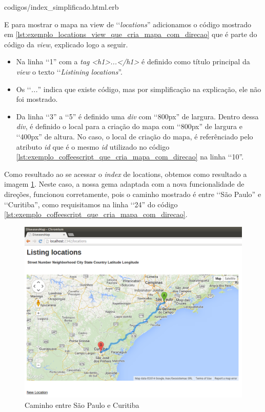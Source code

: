 
{codigos/index_simplificado.html.erb}

E para mostrar o mapa na view de ‘‘\emph{locations}'' adicionamos o código mostrado em
\ref{lst:exemplo_locations_view_que_cria_mapa_com_direcao}
que é parte do código da \emph{view}, explicado logo a seguir.

\begin{itemize}

 \item Na linha ‘‘1'' com a \emph{tag} \emph{<h1>...</h1>} é definido como título principal da \emph{view} o
 texto ‘‘\emph{Listining locations}''.

 \item Os ‘‘\emph{...}'' indica que existe código, mas por simplificação na explicação, ele não foi mostrado.

 \item Da linha ‘‘3'' a ‘‘5'' é definido uma \emph{div} com ‘‘800px'' de largura. Dentro dessa \emph{div},
 é definido o local para a criação do mapa com ‘‘800px'' de largura e ‘‘400px'' de altura. No caso, o local
 de criação do mapa, é referênciado pelo atributo \emph{id} que é o mesmo \emph{id} utilizado no código
 \ref{lst:exemplo_coffeescript_que_cria_mapa_com_direcao} na linha ‘‘10''.

\end{itemize}

Como resultado ao se acessar o \emph{index} de locations, obtemos como resultado a imagem
\ref{fig:caminho_entre_sao_paulo_e_curitiba}. Neste caso, a nossa gema adaptada com a nova funcionalidade
de direções, funcionou corretamente, pois o caminho mostrado é entre ‘‘São Paulo'' e ‘‘Curitiba'', como
requisitamos na linha ‘‘24'' do código \ref{lst:exemplo_coffeescript_que_cria_mapa_com_direcao}.

\begin{figure}[ht]
  \begin{center}
    \includegraphics[scale=0.35]{images/caminho_entre_sao_paulo_e_curitiba.png}
    \caption{Caminho entre São Paulo e Curitiba}
    \label{fig:caminho_entre_sao_paulo_e_curitiba}
  \end{center}
\end{figure}

